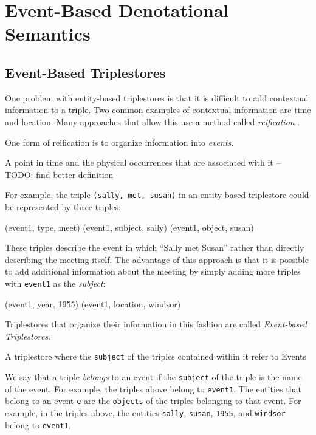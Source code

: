 \documentclass[../main.tex]{subfiles}
\begin{document}
\chapter {Event-Based Denotational Semantics}

\section{Event-Based Triplestores}

One problem with entity-based triplestores is that it is difficult to add contextual information to a triple.  Two common examples of contextual information are time and location.  Many approaches that allow this use a method called {\em reification} \cite{?}.

One form of reification is to organize information into {\em events}.

\begin{definition}[Event]
	A point in time and the physical occurrences that are associated with it \cite{?} -- TODO: find better definition
\end{definition}

For example, the triple \texttt{(sally, met, susan)} in an entity-based triplestore could be represented by three triples:

\begin{code}
	(event1, type, meet)
	(event1, subject, sally)
	(event1, object, susan)
\end{code}

These triples describe the event in which ``Sally met Susan'' rather than directly describing the meeting itself.  The advantage of this approach is that it is possible to add additional information about the meeting by simply adding more triples with \texttt{event1} as the {\em subject}:

\begin{code}
	(event1, year, 1955)
	(event1, location, windsor)
\end{code}

Triplestores that organize their information in this fashion are called {\em Event-based Triplestores}.

\begin{definition}
	A triplestore where the \texttt{subject} of the triples contained within it refer to Events\cite{frostagboola2014}
\end{definition}

We say that a triple {\em belongs} to an event if the \texttt{subject} of the triple is the name of the event.  For example,
the triples above belong to \texttt{event1}.  The entities that belong to an event \texttt{e} are the \texttt{objects} of the triples belonging to that event.
For example, in the triples above, the entities \texttt{sally}, \texttt{susan}, \texttt{1955}, and \texttt{windsor} belong to \texttt{event1}.
\end{document}
